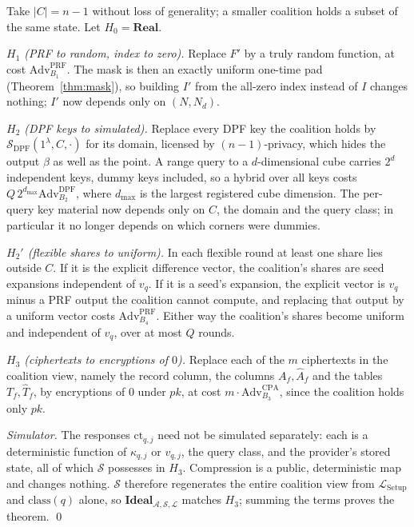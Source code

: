 \documentclass[a4paper,fleqn]{cas-sc}
\newcommand{\Real}{\mathbf{Real}}
\newcommand{\Ideal}{\mathbf{Ideal}}
\newcommand{\Leak}{\mathcal{L}}
\newcommand{\Sim}{\mathcal{S}}
\newcommand{\Adv}{\mathcal{A}}
\begin{document}
\begin{pf}
Take $|C|=n-1$ without loss of generality; a smaller coalition holds a subset
of the same state. Let $H_0=\Real$.

\emph{$H_1$ (PRF to random, index to zero).} Replace $F'$ by a truly random
function, at cost $\mathrm{Adv}^{\mathrm{PRF}}_{B_1}$. The mask is then an
exactly uniform one-time pad (Theorem~\ref{thm:mask}), so building $I'$ from
the all-zero index instead of $I$ changes nothing; $I'$ now depends only on
$(N,N_d)$.

\emph{$H_2$ (DPF keys to simulated).} Replace every DPF key the coalition
holds by $\Sim_{\mathrm{DPF}}(1^\lambda,C,\cdot)$ for its domain, licensed by
$(n{-}1)$-privacy, which hides the output $\beta$ as well as the point. A range
query to a $d$-dimensional cube carries $2^d$ independent keys, dummy keys
included, so a hybrid over all keys costs
$Q\,2^{d_{\max}}\mathrm{Adv}^{\mathrm{DPF}}_{B_2}$, where $d_{\max}$ is the
largest registered cube dimension. The per-query key material now depends only
on $C$, the domain and the query class; in particular it no longer depends on
which corners were dummies.

\emph{$H_2'$ (flexible shares to uniform).} In each flexible round at least one
share lies outside $C$. If it is the explicit difference vector, the
coalition's shares are seed expansions independent of $v_q$. If it is a seed's
expansion, the explicit vector is $v_q$ minus a PRF output the coalition cannot
compute, and replacing that output by a uniform vector costs
$\mathrm{Adv}^{\mathrm{PRF}}_{B_4}$. Either way the coalition's shares become
uniform and independent of $v_q$, over at most $Q$ rounds.

\emph{$H_3$ (ciphertexts to encryptions of $0$).} Replace each of the $m$
ciphertexts in the coalition view, namely the record column, the columns
$A_f,\widehat A_f$ and the tables $T_f,\widehat T_f$, by encryptions of $0$
under $pk$,
at cost $m\cdot\mathrm{Adv}^{\mathrm{CPA}}_{B_3}$, since the coalition holds
only $pk$.

\emph{Simulator.} The responses $\text{ct}_{q,j}$ need not be simulated
separately: each is a deterministic function of $\kappa_{q,j}$ or $v_{q,j}$,
the query class, and the provider's stored state, all of which $\Sim$
possesses in $H_3$. Compression is a public, deterministic map and changes
nothing. $\Sim$ therefore regenerates the entire coalition view from
$\Leak_{\mathrm{Setup}}$ and $\mathrm{class}(q)$ alone, so
$\Ideal_{\Adv,\Sim,\Leak}$ matches $H_3$; summing the terms proves the
theorem. \qed
\end{pf}
\end{document}
